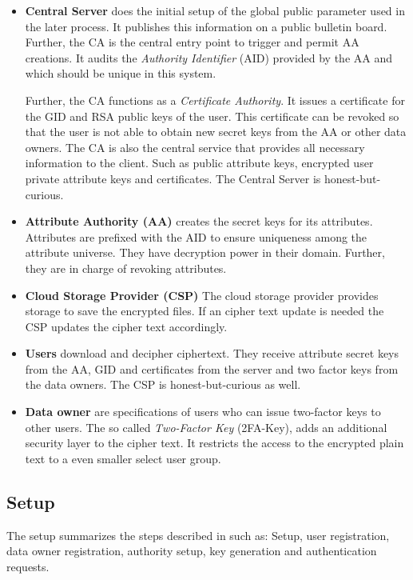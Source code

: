 \begin{itemize}
  \item \textbf{Central Server} does the initial setup of the global public parameter used in the later process. It publishes this information on a public bulletin board. Further, the CA is the central entry point to trigger and permit AA creations. It audits the \textit{Authority Identifier} (\ac{AID}) provided by the AA and which should be unique in this system. 

Further, the CA functions as a \textit{Certificate Authority}. It issues a certificate for the GID and RSA public keys of the user. This certificate can be revoked so that the user is not able to obtain new secret keys from the AA or other data owners.
The CA is also the central service that provides all necessary information to the client. Such as public attribute keys, encrypted user private attribute keys and certificates.
 The Central Server is honest-but-curious.
  \item \textbf{Attribute Authority (\ac{AA})} creates the secret keys for its attributes. Attributes are prefixed with the \ac{AID} to ensure uniqueness among the attribute universe. They have decryption power in their domain. Further, they are in charge of revoking attributes. 
  \item \textbf{Cloud Storage Provider (\ac{CSP})} The cloud storage provider provides storage to save the encrypted files. If an cipher text update is needed the CSP updates the cipher text accordingly. 
  \item \textbf{Users} download and decipher ciphertext. They receive attribute secret keys from the AA, GID and certificates from the server and two factor keys from the data owners. The CSP is honest-but-curious as well.
  \item \textbf{Data owner} are specifications of users who can issue two-factor keys to other users. The so called \textit{Two-Factor Key} (\ac{2FA}-Key), adds an additional security layer to the cipher text. It restricts the access to the encrypted plain text to a even smaller select user group.  
\end{itemize}


\subsection{Setup}
The setup summarizes the steps described in \cite{li2017two} such as: Setup, user registration, data owner registration, authority setup, key generation and authentication requests. 

